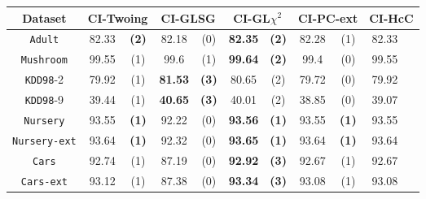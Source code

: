     \begin{table}
    \small
      \centering

\begin{tabular}{c|cc|cc|cc|cc|cc} 
Dataset             & \multicolumn{2}{c|}{CI-Twoing} &   \multicolumn{2}{c|}{CI-GLSG} & \multicolumn{2}{c|}{CI-GL$\chi^2$} & \multicolumn{2}{c|}{CI-PC-ext}& \multicolumn{2}{c}{CI-HcC}\\  \hline   
{\tt Adult}         & 82.33      &  {\bf (2)}        &   82.18      & (0)             & {\bf 82.35} &  {\bf (2)}           & 82.28       & (1)             & 82.33       &             \\
{\tt Mushroom}      & 99.55      &  (1)              &   99.6       & (1)             & {\bf 99.64} &  {\bf (2)}           & 99.4        & (0)             & 99.55       &             \\
{\tt KDD98}-2       & 79.92      &  (1)              &  {\bf 81.53} & {\bf (3)}       &  80.65      &  (2)                 & 79.72       & (0)             & 79.92       &             \\
{\tt KDD98}-9       & 39.44      &  (1)              &  {\bf 40.65} & {\bf (3)}       &  40.01      &  (2)                 & 38.85       & (0)             & 39.07       &             \\
{\tt Nursery}       & 93.55      &  {\bf (1)}        &   92.22      & (0)             & {\bf 93.56} &  {\bf (1)}           & 93.55       & {\bf (1)}       & 93.55       &             \\
{\tt Nursery-ext}   & 93.64      &  {\bf (1)}        &   92.32      & (0)             & {\bf 93.65} &  {\bf (1)}           & 93.64       & {\bf (1)}       & 93.64       &             \\
{\tt Cars}          & 92.74      &  (1)              &   87.19      & (0)             & {\bf 92.92} &  {\bf (3)}           & 92.67       & (1)             & 92.67       &             \\
{\tt Cars-ext}      & 93.12      &  (1)              &   87.38      & (0)             & {\bf 93.34} &  {\bf (3)}           & 93.08       & (1)             & 93.08       &             \\

\end{tabular}
\end{table}
